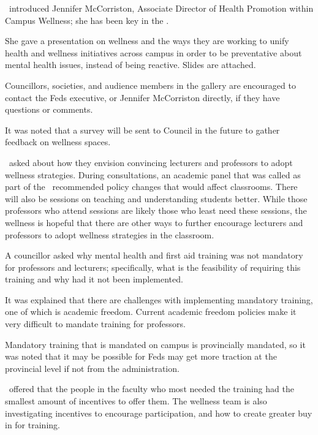 \begin{information}
    \pres\ introduced Jennifer McCorriston, Associate Director of Health
    Promotion within Campus Wellness; she has been key in the \pacsmh.

    She gave a presentation on wellness and the ways they are working to 
    unify health and wellness initiatives across campus in order to be
    preventative about mental health issues, instead of being reactive. Slides
    are attached.

    Councillors, societies, and audience members in the gallery are encouraged
    to contact the Feds executive, or Jennifer McCorriston directly, if they
    have questions or comments.

    It was noted that a survey will be sent to Council in the future to gather
    feedback on wellness spaces.

    \rithika\ asked about how they envision convincing lecturers and 
    professors to adopt wellness strategies. During consultations, an academic
    panel that was called as part of the \pacsmh\ recommended policy
    changes that would affect classrooms. There will also be sessions on
    teaching and understanding students better. While those professors who
    attend sessions are likely those who least need these sessions, the 
    wellness is hopeful that there are other ways to further encourage 
    lecturers and professors to adopt wellness strategies in the classroom.

    A councillor asked why mental health and first aid training was not
    mandatory for professors and lecturers; specifically, what is the
    feasibility of requiring this training and why had it not been implemented.

    It was explained that there are challenges with implementing mandatory 
    training, one of which is academic freedom. Current academic freedom
    policies make it very difficult to mandate training for professors.

    Mandatory training that is mandated on campus is provincially mandated,
    so it was noted that it may be possible for Feds may get more traction
    at the provincial level if not from the administration. 
    
    \katie\ offered that the people in the faculty who most needed the
    training had the smallest amount of incentives to offer them.  The
    wellness team is also investigating incentives to encourage participation,
    and how to create greater buy in for training.  


\end{information}
